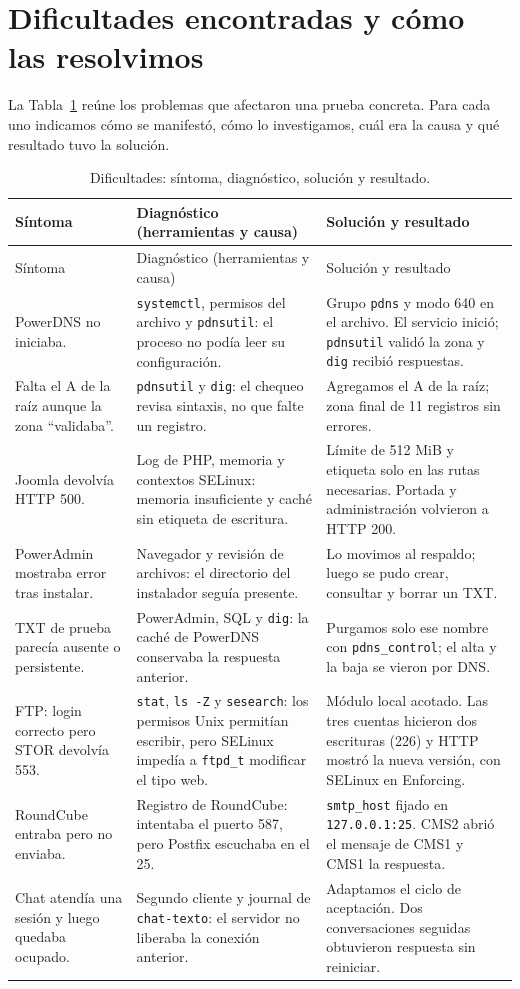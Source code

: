 \documentclass[11pt,a4paper]{article}
\begin{document}
\section{Dificultades encontradas y cómo las resolvimos}
La Tabla~\ref{tab:dificultades} reúne los problemas que afectaron una prueba concreta. Para cada uno indicamos cómo se manifestó, cómo lo investigamos, cuál era la causa y qué resultado tuvo la solución.
\begin{longtable}{@{}>{\raggedright\arraybackslash}p{3.3cm}>{\raggedright\arraybackslash}p{4.6cm}>{\raggedright\arraybackslash}p{5.0cm}@{}}
\caption{Dificultades: síntoma, diagnóstico, solución y resultado.}\label{tab:dificultades}\\
\toprule Síntoma & Diagnóstico (herramientas y causa) & Solución y resultado \\\midrule\endfirsthead
\toprule Síntoma & Diagnóstico (herramientas y causa) & Solución y resultado \\\midrule\endhead
PowerDNS no iniciaba. & \texttt{systemctl}, permisos del archivo y \texttt{pdnsutil}: el proceso no podía leer su configuración. & Grupo \texttt{pdns} y modo 640 en el archivo. El servicio inició; \texttt{pdnsutil} validó la zona y \texttt{dig} recibió respuestas. \\
Falta el A de la raíz aunque la zona ``validaba''. & \texttt{pdnsutil} y \texttt{dig}: el chequeo revisa sintaxis, no que falte un registro. & Agregamos el A de la raíz; zona final de 11 registros sin errores. \\
Joomla devolvía HTTP 500. & Log de PHP, memoria y contextos SELinux: memoria insuficiente y caché sin etiqueta de escritura. & Límite de 512 MiB y etiqueta solo en las rutas necesarias. Portada y administración volvieron a HTTP 200. \\
PowerAdmin mostraba error tras instalar. & Navegador y revisión de archivos: el directorio del instalador seguía presente. & Lo movimos al respaldo; luego se pudo crear, consultar y borrar un TXT. \\
TXT de prueba parecía ausente o persistente. & PowerAdmin, SQL y \texttt{dig}: la caché de PowerDNS conservaba la respuesta anterior. & Purgamos solo ese nombre con \texttt{pdns\_control}; el alta y la baja se vieron por DNS. \\
FTP: login correcto pero STOR devolvía 553. & \texttt{stat}, \texttt{ls -Z} y \texttt{sesearch}: los permisos Unix permitían escribir, pero SELinux impedía a \texttt{ftpd\_t} modificar el tipo web. & Módulo local acotado. Las tres cuentas hicieron dos escrituras (226) y HTTP mostró la nueva versión, con SELinux en Enforcing. \\
RoundCube entraba pero no enviaba. & Registro de RoundCube: intentaba el puerto 587, pero Postfix escuchaba en el 25. & \texttt{smtp\_host} fijado en \texttt{127.0.0.1:25}. CMS2 abrió el mensaje de CMS1 y CMS1 la respuesta. \\
Chat atendía una sesión y luego quedaba ocupado. & Segundo cliente y journal de \texttt{chat-texto}: el servidor no liberaba la conexión anterior. & Adaptamos el ciclo de aceptación. Dos conversaciones seguidas obtuvieron respuesta sin reiniciar. \\
\bottomrule
\end{longtable}
\end{document}
